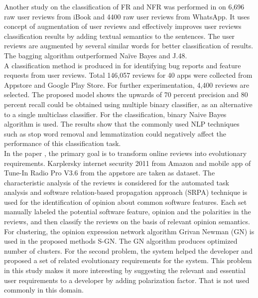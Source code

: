 	Another study on the classification of FR
and NFR was performed in \cite{lu2017automatic} on 6,696 raw user reviews from
iBook and 4400 raw user reviews from WhatsApp. It uses concept of
augmentation of user reviews and effectively improves user reviews classification results by
adding textual semantics to the sentences. The user reviews are augmented by several similar
words for better classification of results. The bagging algorithm outperformed Naïve Bayes and J.48.\\

	A classification method is produced in \cite{maalej2015bug} for identifying
bug reports and feature requests from user reviews. Total 146,057 reviews for 40 apps were
collected from Appstore and Google Play Store. For further experimentation, 4,400 reviews
are selected. The proposed model shows the upwards of 70 percent precision and 80 percent
recall could be obtained using multiple binary classifier, as an alternative to a single multiclass
classifier. For the classification, binary Naive Bayes algorithm is used. The results show that
the commonly used NLP techniques such as stop word removal and lemmatization could
negatively affect the performance of this classification task.\\

	In the paper \cite{jiang2014}, the primary goal is to transform online reviews into evolutionary requirements.
Karplersky internet security 2011 from Amazon and mobile app of Tune-In Radio Pro V3.6
from the appstore are taken as dataset. The characteristic analysis of the reviews is
considered for the automated task analysis and software relation-based propagation approach
(SRPA) technique is used for the identification of opinion about common software features. Each set
manually labeled the potential software feature, opinion and the polarities in the reviews, and
then classify the reviews on the basis of relevant opinion semantics. For clustering, the opinion
expression network algorithm Grivan Newman (GN) is used in the proposed methods S-GN. The GN algorithm produces optimized number of clusters. For the second problem, the system helped the developer and proposed a set of related evolutionary requirements for the system. This problem in this study makes it more interesting by suggesting the relevant and essential user requirements to a developer by adding polarization factor. That is not used
commonly in this domain.\\

